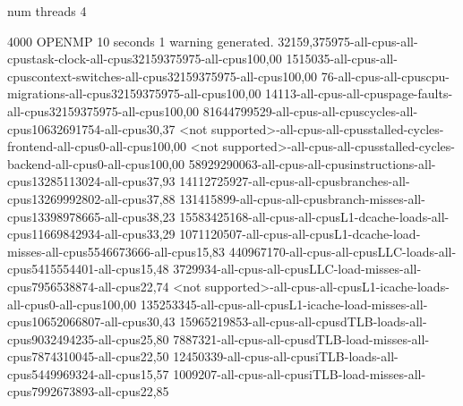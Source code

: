num threads 4

4000
OPENMP
10 seconds
1 warning generated.
32159,375975-all-cpus-all-cpustask-clock-all-cpus32159375975-all-cpus100,00
1515035-all-cpus-all-cpuscontext-switches-all-cpus32159375975-all-cpus100,00
76-all-cpus-all-cpuscpu-migrations-all-cpus32159375975-all-cpus100,00
14113-all-cpus-all-cpuspage-faults-all-cpus32159375975-all-cpus100,00
81644799529-all-cpus-all-cpuscycles-all-cpus10632691754-all-cpus30,37
<not supported>-all-cpus-all-cpusstalled-cycles-frontend-all-cpus0-all-cpus100,00
<not supported>-all-cpus-all-cpusstalled-cycles-backend-all-cpus0-all-cpus100,00
58929290063-all-cpus-all-cpusinstructions-all-cpus13285113024-all-cpus37,93
14112725927-all-cpus-all-cpusbranches-all-cpus13269992802-all-cpus37,88
131415899-all-cpus-all-cpusbranch-misses-all-cpus13398978665-all-cpus38,23
15583425168-all-cpus-all-cpusL1-dcache-loads-all-cpus11669842934-all-cpus33,29
1071120507-all-cpus-all-cpusL1-dcache-load-misses-all-cpus5546673666-all-cpus15,83
440967170-all-cpus-all-cpusLLC-loads-all-cpus5415554401-all-cpus15,48
3729934-all-cpus-all-cpusLLC-load-misses-all-cpus7956538874-all-cpus22,74
<not supported>-all-cpus-all-cpusL1-icache-loads-all-cpus0-all-cpus100,00
135253345-all-cpus-all-cpusL1-icache-load-misses-all-cpus10652066807-all-cpus30,43
15965219853-all-cpus-all-cpusdTLB-loads-all-cpus9032494235-all-cpus25,80
7887321-all-cpus-all-cpusdTLB-load-misses-all-cpus7874310045-all-cpus22,50
12450339-all-cpus-all-cpusiTLB-loads-all-cpus5449969324-all-cpus15,57
1009207-all-cpus-all-cpusiTLB-load-misses-all-cpus7992673893-all-cpus22,85

